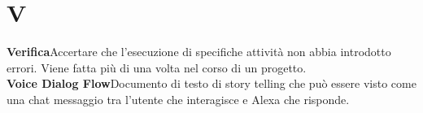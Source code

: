 \newpage
\section{V}\label{l:V}
\textbf{Verifica}\newline Accertare che l’esecuzione di specifiche attività non abbia introdotto errori. Viene fatta più di una volta nel corso di un progetto. \\
\newline
\textbf{Voice Dialog Flow}\newline Documento di testo di story telling che può essere visto come una chat messaggio tra l'utente che interagisce e Alexa che risponde.